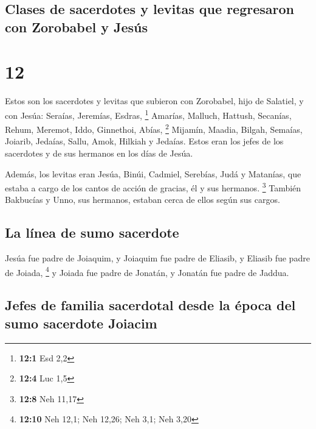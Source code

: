 \hypertarget{clases-de-sacerdotes-y-levitas-que-regresaron-con-zorobabel-y-jesuxfas}{%
\subsection{Clases de sacerdotes y levitas que regresaron con Zorobabel
y
Jesús}\label{clases-de-sacerdotes-y-levitas-que-regresaron-con-zorobabel-y-jesuxfas}}

\hypertarget{section-11}{%
\section{12}\label{section-11}}

 Estos son los sacerdotes y levitas que subieron con
Zorobabel, hijo de Salatiel, y con Jesúa: Seraías, Jeremías, Esdras,
\footnote{\textbf{12:1} Esd 2,2}  Amarías, Malluch,
Hattush,  Secanías, Rehum, Meremot,  Iddo,
Ginnethoi, Abías, \footnote{\textbf{12:4} Luc 1,5} 
Mijamín, Maadia, Bilgah,  Semaías, Joiarib, Jedaías,
 Sallu, Amok, Hilkiah y Jedaías. Estos eran los jefes de
los sacerdotes y de sus hermanos en los días de Jesúa.

 Además, los levitas eran Jesúa, Binúi, Cadmiel, Serebías,
Judá y Matanías, que estaba a cargo de los cantos de acción de gracias,
él y sus hermanos. \footnote{\textbf{12:8} Neh 11,17} 
También Bakbucías y Unno, sus hermanos, estaban cerca de ellos según sus
cargos.

\hypertarget{la-luxednea-de-sumo-sacerdote}{%
\subsection{La línea de sumo
sacerdote}\label{la-luxednea-de-sumo-sacerdote}}

 Jesúa fue padre de Joiaquim, y Joiaquim fue padre de
Eliasib, y Eliasib fue padre de Joiada, \footnote{\textbf{12:10} Neh
  12,1; Neh 12,26; Neh 3,1; Neh 3,20}  y Joiada fue padre
de Jonatán, y Jonatán fue padre de Jaddua.

\hypertarget{jefes-de-familia-sacerdotal-desde-la-uxe9poca-del-sumo-sacerdote-joiacim}{%
\subsection{Jefes de familia sacerdotal desde la época del sumo
sacerdote
Joiacim}\label{jefes-de-familia-sacerdotal-desde-la-uxe9poca-del-sumo-sacerdote-joiacim}}

